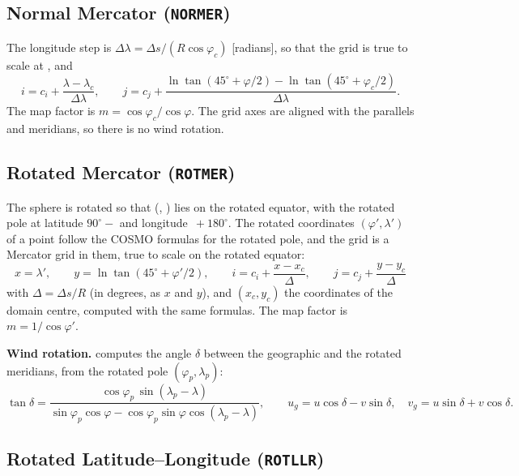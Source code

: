 \subsection{Normal Mercator (\texttt{NORMER})}
\label{subsec:proj_mercator}

The longitude step is $\Delta\lambda = \Delta s/(R\cos\varphi_c)$
[radians], so that the grid is true to scale at , and
\[
  i = c_i + \frac{\lambda - \lambda_c}{\Delta\lambda}, \qquad
  j = c_j + \frac{\ln\tan(45^\circ + \varphi/2) -
                  \ln\tan(45^\circ + \varphi_c/2)}{\Delta\lambda}.
\]
The map factor is $m = \cos\varphi_c/\cos\varphi$. The grid axes are
aligned with the parallels and meridians, so there is no wind rotation.

\subsection{Rotated Mercator (\texttt{ROTMER})}
\label{subsec:proj_rotmer}

The sphere is rotated so that (, ) lies on the
rotated equator, with the rotated pole at latitude $90^\circ -$
 and longitude $\,+180^\circ$. The rotated
coordinates $(\varphi', \lambda')$ of a point follow the COSMO formulas
for the rotated pole, and the grid is a Mercator grid in them, true to
scale on the rotated equator:
\[
  x = \lambda', \qquad y = \ln\tan(45^\circ + \varphi'/2), \qquad
  i = c_i + \frac{x - x_c}{\Delta}, \qquad
  j = c_j + \frac{y - y_c}{\Delta}
\]
with $\Delta = \Delta s/R$ (in degrees, as $x$ and $y$), and $(x_c, y_c)$
the coordinates of the domain centre, computed with the same formulas. The
map factor is $m = 1/\cos\varphi'$.

\textbf{Wind rotation.}  computes the angle $\delta$
between the geographic and the rotated meridians, from the rotated pole
$(\varphi_p, \lambda_p)$:
\[
  \tan\delta = \frac{\cos\varphi_p\,\sin(\lambda_p - \lambda)}
                    {\sin\varphi_p\cos\varphi -
                     \cos\varphi_p\sin\varphi\cos(\lambda_p - \lambda)},
  \qquad
  u_g = u\cos\delta - v\sin\delta, \quad
  v_g = u\sin\delta + v\cos\delta.
\]

\subsection{Rotated Latitude--Longitude (\texttt{ROTLLR})}
\label{subsec:proj_rotllr}

